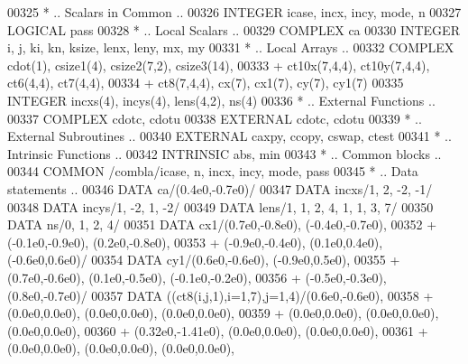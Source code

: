 \begin{DoxyCode}
00325 \textcolor{comment}{*     .. Scalars in Common ..}
00326       \textcolor{keywordtype}{INTEGER}           icase, incx, incy, mode, n
00327       \textcolor{keywordtype}{LOGICAL}           pass
00328 \textcolor{comment}{*     .. Local Scalars ..}
00329       \textcolor{keywordtype}{COMPLEX}           ca
00330       \textcolor{keywordtype}{INTEGER}           i, j, ki, kn, ksize, lenx, leny, mx, my
00331 \textcolor{comment}{*     .. Local Arrays ..}
00332       \textcolor{keywordtype}{COMPLEX}           cdot(1), csize1(4), csize2(7,2), csize3(14),
00333      +                  ct10x(7,4,4), ct10y(7,4,4), ct6(4,4), ct7(4,4),
00334      +                  ct8(7,4,4), cx(7), cx1(7), cy(7), cy1(7)
00335       \textcolor{keywordtype}{INTEGER}           incxs(4), incys(4), lens(4,2), ns(4)
00336 \textcolor{comment}{*     .. External Functions ..}
00337       \textcolor{keywordtype}{COMPLEX}           cdotc, cdotu
00338       \textcolor{keywordtype}{EXTERNAL}          cdotc, cdotu
00339 \textcolor{comment}{*     .. External Subroutines ..}
00340       \textcolor{keywordtype}{EXTERNAL}          caxpy, ccopy, cswap, ctest
00341 \textcolor{comment}{*     .. Intrinsic Functions ..}
00342       \textcolor{keywordtype}{INTRINSIC}         abs, min
00343 \textcolor{comment}{*     .. Common blocks ..}
00344       \textcolor{keyword}{COMMON}            /combla/icase, n, incx, incy, mode, pass
00345 \textcolor{comment}{*     .. Data statements ..}
00346       \textcolor{keyword}{DATA}              ca/(0.4e0,-0.7e0)/
00347       \textcolor{keyword}{DATA}              incxs/1, 2, -2, -1/
00348       \textcolor{keyword}{DATA}              incys/1, -2, 1, -2/
00349       \textcolor{keyword}{DATA}              lens/1, 1, 2, 4, 1, 1, 3, 7/
00350       \textcolor{keyword}{DATA}              ns/0, 1, 2, 4/
00351       \textcolor{keyword}{DATA}              cx1/(0.7e0,-0.8e0), (-0.4e0,-0.7e0),
00352      +                  (-0.1e0,-0.9e0), (0.2e0,-0.8e0),
00353      +                  (-0.9e0,-0.4e0), (0.1e0,0.4e0), (-0.6e0,0.6e0)/
00354       \textcolor{keyword}{DATA}              cy1/(0.6e0,-0.6e0), (-0.9e0,0.5e0),
00355      +                  (0.7e0,-0.6e0), (0.1e0,-0.5e0), (-0.1e0,-0.2e0),
00356      +                  (-0.5e0,-0.3e0), (0.8e0,-0.7e0)/
00357       \textcolor{keyword}{DATA}              ((ct8(i,j,1),i=1,7),j=1,4)/(0.6e0,-0.6e0),
00358      +                  (0.0e0,0.0e0), (0.0e0,0.0e0), (0.0e0,0.0e0),
00359      +                  (0.0e0,0.0e0), (0.0e0,0.0e0), (0.0e0,0.0e0),
00360      +                  (0.32e0,-1.41e0), (0.0e0,0.0e0), (0.0e0,0.0e0),
00361      +                  (0.0e0,0.0e0), (0.0e0,0.0e0), (0.0e0,0.0e0),

\end{DoxyCode}
